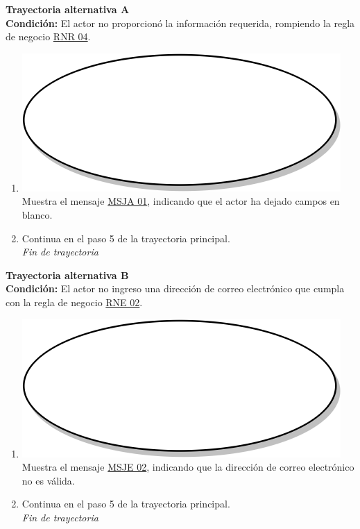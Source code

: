 \textbf{Trayectoria alternativa A} \label{cu1_ta_a} \\
\textbf{Condición:} El actor no proporcionó la información requerida, rompiendo la regla de negocio \hyperref[rnr_04]{RNR 04}.\\
 \begin{enumerate}[label=A\arabic*]
    \item {\includegraphics[scale=.05]{Capitulo3/img/proceso.png} Muestra el mensaje \hyperref[msja_01]{MSJA 01}, indicando que el actor ha dejado campos en blanco.}
    \item {Continua en el paso 5 de la trayectoria principal.} \\
    \textit{Fin de trayectoria} \\
\end{enumerate}

\textbf{Trayectoria alternativa B} \label{cu1_ta_b}\\
\textbf{Condición:} El actor no ingreso una dirección de correo electrónico que cumpla con la regla de negocio \hyperref[rne_02]{RNE 02}.\\
 \begin{enumerate}[label=B\arabic*]
    \item {\includegraphics[scale=.05]{Capitulo3/img/proceso.png} Muestra el mensaje \hyperref[msje_02]{MSJE 02}, indicando que la dirección de correo electrónico no es válida.}
    \item {Continua en el paso 5 de la trayectoria principal.} \\
    \textit{Fin de trayectoria} \\
\end{enumerate}

